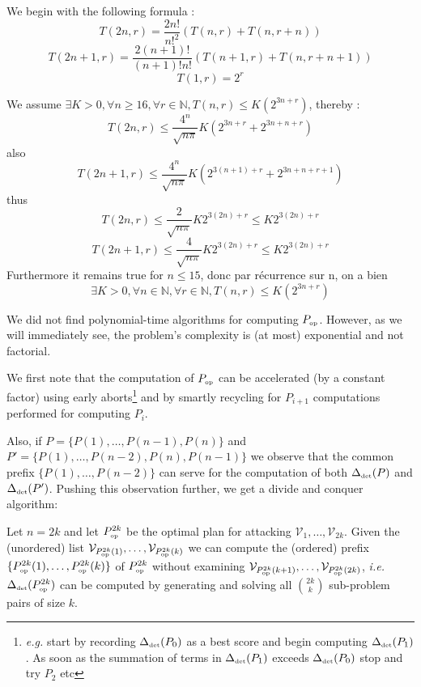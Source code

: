 \documentclass[11pt]{llncs}
\begin{document}
We begin with the following formula :
\[
	T(2n, r) = \frac{2n!}{n!^2}(T(n, r)+T(n, r+n))
\]
\[
	T(2n+1, r) = \frac{2(n+1)!}{(n+1)!n!}(T(n+1, r)+T(n, r+n+1))
\]
\[
	T(1, r) = 2^r
\]

We assume $\exists K > 0, \forall n \geqslant 16, \forall r \in \mathbb{N}, T(n, r) \leqslant K(2^{3n+r})$, thereby :
\[
	T(2n, r) \leqslant \frac{4^n}{\sqrt{n\pi}}K(2^{3n+r}+2^{3n+n+r})
\]
also
\[
	T(2n+1, r) \leqslant \frac{4^n}{\sqrt{n\pi}}K(2^{3(n+1)+r}+2^{3n+n+r+1})
\]
thus
\[
	T(2n, r) \leqslant \frac{2}{\sqrt{n\pi}}K2^{3(2n)+r} \leqslant K2^{3(2n)+r}
\]
\[
	T(2n+1, r) \leqslant \frac{4}{\sqrt{n\pi}}K2^{3(2n)+r} \leqslant K2^{3(2n)+r}
\]
Furthermore it remains true for $n \leqslant 15$, donc par récurrence sur n, on a bien
\[
	\boxed{ \exists K > 0, \forall n \in \mathbb{N}, \forall r \in \mathbb{N}, T(n, r) \leqslant K(2^{3n+r}) }
\]

We did not find polynomial-time algorithms for computing $P_{\mbox{{\tiny op}}}$. However, as we will immediately see, the problem's complexity is (at most) exponential and not factorial.\smallskip

We first note that the computation of $P_{\mbox{{\tiny op}}}$ can be accelerated (by a constant factor) using early aborts\footnote{{\sl e.g.} start by recording $\Delta_{\mbox{{\tiny det}}}(P_0)$ as a best score and begin computing $\Delta_{\mbox{{\tiny det}}}(P_1)$. As soon as the summation of terms in $\Delta_{\mbox{{\tiny det}}}(P_1)$ exceeds $\Delta_{\mbox{{\tiny det}}}(P_0)$ stop and try $P_2$ etc} and by smartly recycling for $P_{i+1}$ computations performed for computing $P_i$.\smallskip

Also, if $P=\{P(1),\ldots,P(n-1),P(n)\}$ and $P'=\{P(1),\ldots,P(n-2),P(n),P(n-1)\}$ we observe that the common prefix $\{P(1),\ldots,P(n-2)\}$ can serve for the computation of both $\Delta_{\mbox{{\tiny det}}}(P)$ and $\Delta_{\mbox{{\tiny det}}}(P')$. Pushing this observation further, we get a divide and conquer algorithm: \smallskip

Let $n=2k$ and let $P_{\mbox{{\tiny op}}}^{2k}$ be the optimal plan for attacking $\mathcal{V}_1,\ldots,\mathcal{V}_{2k}$. Given the (unordered) list $\mathcal{V}_{P_{\mbox{{\tiny op}}}^{2k}(1)},\ldots,\mathcal{V}_{P_{\mbox{{\tiny op}}}^{2k}(k)}$ we can compute the (ordered) prefix $\{P_{\mbox{{\tiny op}}}^{2k}(1),\ldots,P_{\mbox{{\tiny op}}}^{2k}(k)\}$ of $P_{\mbox{{\tiny op}}}^{2k}$ without examining $\mathcal{V}_{P_{\mbox{{\tiny op}}}^{2k}(k+1)},\ldots,\mathcal{V}_{P_{\mbox{{\tiny op}}}^{2k}(2k)}$, {\sl i.e.} $\Delta_{\mbox{{\tiny det}}}(P_{\mbox{{\tiny op}}}^{2k})$ can be computed by generating and solving all $\binom{2k}{k}$ sub-problem pairs of size $k$.\smallskip
\end{document}
